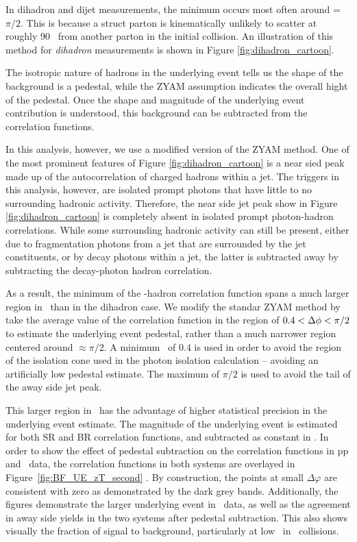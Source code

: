 In dihadron and dijet measurements, the minimum occurs most often around \deltaphi = $\pi/2$. This is because a struct parton is kinematically unlikely to scatter at roughly 90 \degree~from another parton in the initial collision. An illustration of this method for \textit{dihadron} measurements is shown in Figure \ref{fig:dihadron_cartoon}.

The isotropic nature of hadrons in the underlying event tells us the shape of the background is a pedestal, while the ZYAM assumption indicates the overall hight of the pedestal. Once the shape and magnitude of the underlying event contribution is understood, this background can be subtracted from the correlation functions. 

In this analysis, however, we use a modified version of the ZYAM method. One of the most prominent features of Figure \ref{fig:dihadron_cartoon} is a near sied peak made up of the autocorrelation of charged hadrons within a jet. The triggers in this analysis, however, are isolated prompt photons that have little to no surrounding hadronic activity.  Therefore, the near side jet peak show in Figure \ref{fig:dihadron_cartoon} is completely absent in isolated prompt photon-hadron correlations. While some surrounding hadronic activity can still be present, either due to fragmentation photons from a jet that are surrounded by the jet constituents, or by decay photons within a jet, the latter is subtracted away by subtracting the decay-photon hadron correlation.

As a result, the minimum of the \gammaiso-hadron correlation function spans a much larger region in \deltaphi~than in the dihadron case. We modify the standar ZYAM method by take the average value of the correlation function in the region of $0.4 < \Delta\phi < \pi/2$ to estimate the underlying event pedestal, rather than a much narrower region centered around \deltaphi$\approx \pi/2$.  A minimum \deltaphi~of $0.4$ is used in order to avoid the region of the isolation cone used in the photon isolation calculation -- avoiding an artificially low pedestal estimate. The maximum of $\pi/2$ is used to avoid the tail of the away side jet peak.

This larger region in \deltaphi~has the advantage of higher statistical precision in the underlying event estimate. The magnitude of the underlying event is estimated for both SR and BR correlation functions, and subtracted as constant in \deltaphi. In order to show the effect of pedestal subtraction on the correlation functions in pp and \pPb~data, the correlation functions in both systems are overlayed in Figure~\ref{fig:BF_UE_zT_second} . By construction, the points at small $\Delta\varphi$ are consistent with zero as demonstrated by the dark grey bands. Additionally, the figures demonstrate the larger underlying event in \pPb~data, as well as the agreement in away side yields in the two systems after pedestal subtraction. This also shows visually the fraction of signal to background, particularly at low \zt~in \pPb~collisions.


